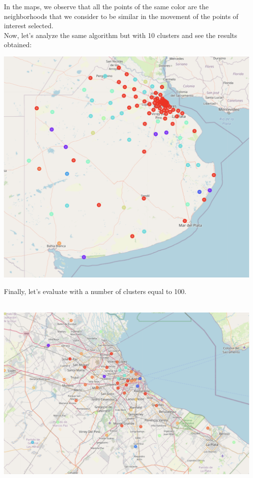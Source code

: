 \documentclass[12pt,a4paper]{tesis}
\begin{document}
In the maps, we observe that all the points of the same color are the neighborhoods that we consider to be similar in the movement of the points of interest selected. \\

Now, let's analyze the same algorithm but with 10 clusters and see the results obtained:

\centerline{
	\includegraphics[scale=0.5]{mapa8}
}

\newpage
Finally, let's evaluate with a number of clusters equal to 100. \\ \\


\centerline{
	\includegraphics[scale=0.45]{mapa9}
}
\end{document}
